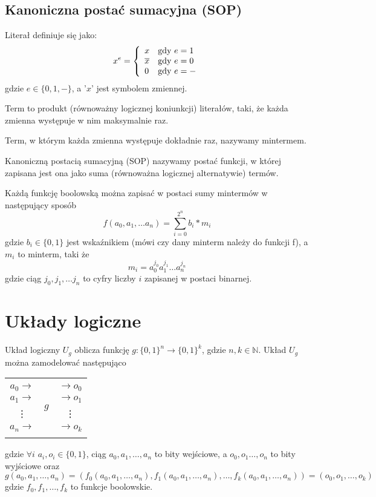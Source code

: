 \subsection{Kanoniczna postać sumacyjna (SOP)}
\begin{definition}
Literał definiuje się jako:
$$
x^e = \left\{ \begin{array}{ll}
x & \textrm{gdy $ e = 1$}\\
\overline{x} & \textrm{gdy $ e = 0 $} \\
0 & \textrm{gdy $e = -$}
\end{array} \right.
$$
gdzie $e \in \{0, 1, -\}$, a '$x$' jest symbolem zmiennej.
\end{definition}
\begin{definition}
    Term to produkt (równoważny logicznej koniunkcji) literałów, taki, że każda zmienna występuje w nim maksymalnie raz.
\end{definition}
\begin{definition}
    Term, w którym każda zmienna występuje dokładnie raz, nazywamy mintermem.
\end{definition}
\begin{definition}
    Kanoniczną postacią sumacyjną (SOP) nazywamy postać funkcji, w której zapisana jest ona jako suma (równoważna logicznej alternatywie) termów.
\end{definition}
Każdą funkcję boolowską można zapisać w postaci sumy mintermów w następujący sposób
\[f(a_0, a_1, \ldots a_n) = \sum_{i=0}^{2^n} b_i*m_i\]
gdzie $b_i \in \{0, 1\}$ jest wskaźnikiem (mówi czy dany minterm należy do funkcji f), a $m_i$ to minterm, taki że
\[m_i = a_0^{j_0}a_1^{j_1} \ldots a_n^{j_n}\]
gdzie ciąg $j_0, j_1, \ldots j_n$ to cyfry liczby $i$ zapisanej w postaci binarnej.
\section{Układy logiczne}
Układ logiczny $U_g$ oblicza funkcję $g: \{0,1\}^n \rightarrow \{0,1\}^k$, gdzie $n,k \in \mathbb{N}$. Układ $U_g$ można zamodelować następująco
\begin{center}
    \begin{tabular}{ c | c | c }
        \cline{2-2}
        & & \\
        $a_0 \rightarrow$ & \multirow{4}{5cm}{\centering$g$ 
        } & $\rightarrow o_0 $
        \\
        $a_1 \rightarrow$ &  & $\rightarrow o_1 $
        \\
        \vdots & & \vdots\\
        $a_n \rightarrow$ & & $\rightarrow o_k $
        \\
        & & \\
        \cline{2-2}
    \end{tabular} 
\end{center}
gdzie  $\forall i$ $a_i, o_i \in \{0, 1\}$, ciąg $a_0, a_1, \ldots, a_n$ to bity wejściowe, a $o_0, o_1 \ldots, o_n$ to bity wyjściowe oraz
\[g(a_0, a_1, \ldots, a_n) = (f_0(a_0, a_1, \ldots, a_n), f_1(a_0, a_1, \ldots, a_n), \ldots, f_k(a_0, a_1, \ldots, a_n)) =  (o_0, o_1, \ldots, o_k)\]
gdzie $f_0, f_1, \ldots, f_k$ to funkcje boolowskie.
